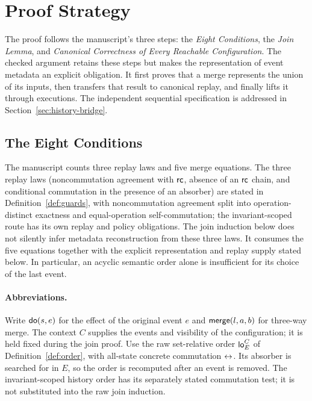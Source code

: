 
\section{Proof Strategy}\label{sec:proof-strategy}

The proof follows the manuscript's three steps: the \emph{Eight Conditions},
the \emph{Join Lemma}, and \emph{Canonical Correctness of Every Reachable
Configuration}. The checked argument retains these steps but makes the
representation of event metadata an explicit obligation. It first proves
that a merge represents the union of its inputs, then transfers that result
to canonical replay, and finally lifts it through executions. The independent
sequential specification is addressed in Section~\ref{sec:history-bridge}.

\subsection{The Eight Conditions}\label{sec:vcs}
The manuscript counts three replay laws and five merge equations. The three
replay laws (noncommutation agreement with $\mathsf{rc}$, absence of an
$\mathsf{rc}$ chain, and conditional commutation in the presence of an absorber)
are stated in Definition~\ref{def:guards}, with noncommutation agreement
split into operation-distinct exactness and equal-operation self-commutation;
the invariant-scoped route has its own replay and policy obligations.
The join induction below does not silently infer metadata reconstruction from
these three laws. It consumes the five equations together with the explicit
representation and replay supply stated below. In particular, an acyclic
semantic order alone is insufficient for its choice of the last event.

\paragraph{Abbreviations.}
Write $\mathsf{do}(s,e)$ for the effect of the original event $e$ and
$\mathsf{merge}(l,a,b)$ for three-way merge. The context $C$ supplies the events
and visibility of the configuration; it is held fixed during the join proof.
Use the raw set-relative order $\mathsf{lo}^{C}_{E}$ of
Definition~\ref{def:order}, with all-state concrete commutation $\leftrightarrow$.
Its absorber is searched for in $E$, so the order is recomputed after an event
is removed. The invariant-scoped history order has its separately stated
commutation test; it is not substituted into the raw join induction.

